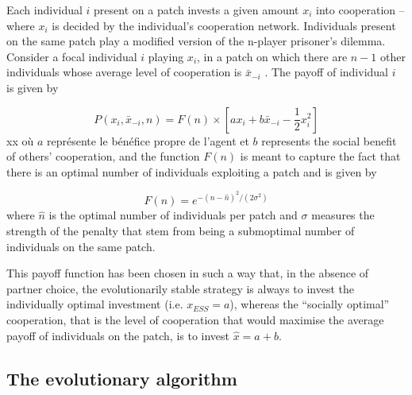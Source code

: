 Each individual $i$ present on a patch invests a given amount $x_i$ into cooperation --where $x_i$ is decided by the individual's cooperation network. Individuals present on the same patch play a modified version of the n-player prisoner's dilemma. Consider a focal individual $i$ playing $x_i$, in a patch on which there are $n-1$ other individuals whose average level of cooperation is $\bar{x}_{-i}$ . The payoff of individual $i$ is given by

\begin{equation}
P(x_i, \bar{x}_{-i}, n) = F(n)  \times  \left[ a x_{i} +  b  \bar{x}_{-i} - \frac{1}{2}  x_i^2\right]
\end{equation}
xx où $a$ représente le bénéfice propre de l'agent et $b$ represents the social benefit of others' cooperation, and the function $F(n)$ is meant to capture the fact that there is an optimal number of individuals exploiting a patch and is given by

\begin{equation}
F(n) = e^{ - \left( {n - \hat{n} } \right)^2  / (2\sigma^2) } \label{eq:friction}
\end{equation}where $\hat{n}$ is the optimal number of individuals per patch and $\sigma$ measures the strength of the penalty that stem from being a submoptimal number of individuals on the same patch.

This payoff function has been chosen in such a way that, in the absence of partner choice, the evolutionarily stable strategy is always to invest the individually optimal investment (i.e. $x_{ESS} = a$), whereas the ``socially optimal'' cooperation, that is the level of cooperation that would maximise the average payoff of individuals on the patch, is to invest $\hat{x} = a + b$.






\subsection{The evolutionary algorithm}\label{sec:evolutionaryalgo}

